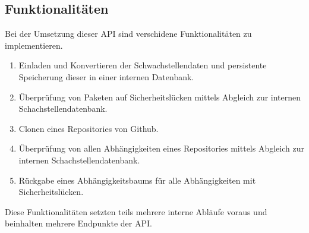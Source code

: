 \subsection{Funktionalitäten} \label{sec:Funktionalitäten}
Bei der Umsetzung dieser API sind verschidene Funktionalitäten zu implementieren.
\begin{enumerate}
    \item Einladen und Konvertieren der Schwachstellendaten und persistente Speicherung dieser in einer internen Datenbank.
    \item Überprüfung von Paketen auf Sicherheitslücken mittels Abgleich zur internen Schachstellendatenbank.
    \item Clonen eines Repositories von Github.
    \item Überprüfung von allen Abhängigkeiten eines Repositories mittels Abgleich zur internen Schachstellendatenbank.
    \item Rückgabe eines Abhängigkeitsbaums für alle Abhängigkeiten mit Sicherheitslücken. 
\end{enumerate}
Diese Funktionalitäten setzten teils mehrere interne Abläufe voraus und beinhalten mehrere Endpunkte der API.
